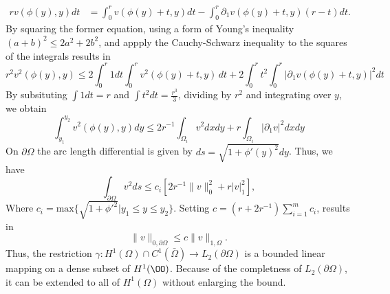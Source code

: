 \begin{bev}
\begin{align*}
        r v(\phi(y), y) dt &= \int_0^r v(\phi(y) + t, y) dt - \int_0^r \partial_1 v(\phi(y) + t, y)(r-t) dt.
    \end{align*}
    By squaring the former equation, using a form of Young's inequality ${(a+b)}^2 \leq 2a^2 + 2b^2$, and appply the Cauchy-Schwarz inequality to the squares of the integrals results in
    \begin{equation}
        r^2 v^2(\phi(y), y) \leq 2 \int_0^r 1 dt \int_0^r v^2(\phi(y) + t, y) \, dt +  2\int_0^r t^2 \int_0^r | \partial_1  v(\phi(y) + t, y) |^2 dt
    \end{equation}
    By subsituting $\int 1 dt = r$ and $\int t^2 dt = \frac{r^3}{3}$, dividing by $r^2$ and integrating over $y$, we obtain
    \begin{equation}
        \int_{y_1}^{y_2} v^2(\phi(y), y) dy \leq  2r^{-1} \int_{\Omega_i} v^2 dx dy + r \int_{\Omega_i} | \partial_1 v |^2 dx dy
    \end{equation} %
    On $\partial\Omega$ the arc length differential is given by $ds = \sqrt{1 + \phi'{(y)}^2} dy$. Thus, we have
    \begin{equation}
        \int_{\partial\Omega} v^2 ds \leq c_i \left[ 2r^{-1} \| v \|_0^2 + r | v |^2_1 \right],
    \end{equation}
    Where $c_i = \text{max}\{\sqrt{1+{\phi'}^2} | y_1 \leq y \leq y_2 \}$. Setting $c=(r+2r^{-1})\sum_{i=1}^m c_i$, results in
    \begin{equation}
        \| v \|_{0,\partial\Omega} \leq c \| v \|_{1,\Omega}.
    \end{equation}
    Thus, the restriction $\gamma : H^1(\Omega) \cap C^1(\bar{\Omega}) \to L_2(\partial \Omega)$ is a bounded linear mapping on a dense subset of $H^1(\OO)$. Because of the completness of $L_2(\partial \Omega)$, it can be extended to all of $H^1(\Omega)$ without enlarging the bound.
\end{bev}